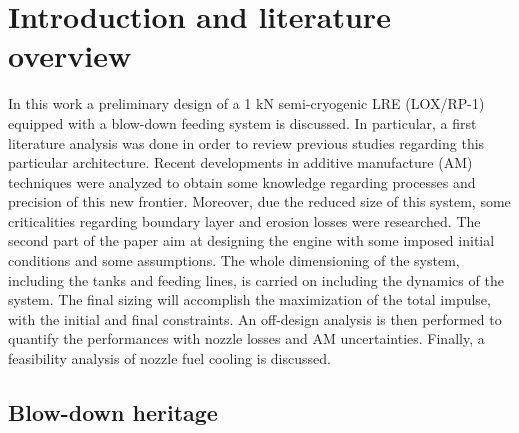 \section{Introduction and literature overview}
\label{sec:introduction}

In this work a preliminary design of a 1 kN semi-cryogenic LRE (LOX/RP-1) equipped with a blow-down feeding system is discussed. In particular, a first literature analysis was done in order to review previous studies regarding this particular architecture. Recent developments in additive manufacture (AM) techniques were analyzed to obtain some knowledge regarding processes and precision of this new frontier. Moreover, due the reduced size of this system, some criticalities regarding boundary layer and erosion losses were researched.
The second part of the paper aim at designing the engine with some imposed initial conditions and some assumptions. The whole dimensioning of the system, including the tanks and feeding lines, is carried on including the dynamics of the system. The final sizing will accomplish the maximization of the total impulse, with the initial and final constraints. 
An off-design analysis is then performed to quantify the performances with nozzle losses and AM uncertainties. Finally, a feasibility analysis of  nozzle fuel cooling is discussed. 

\subsection{Blow-down heritage}
\label{subsec:blowdown_intro}

